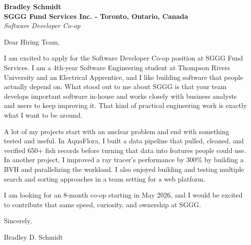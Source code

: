 \documentclass[11pt]{article}
\begin{document}
\textbf{Bradley Schmidt}\\
\vspace{0.5em}
\textbf{SGGG Fund Services Inc. - Toronto, Ontario, Canada}\\
\textit{Software Developer Co-op}

Dear Hiring Team,

\par

I am excited to apply for the Software Developer Co-op position at SGGG Fund Services. I am a 4th-year Software Engineering student at Thompson Rivers University and an Electrical Apprentice, and I like building software that people actually depend on. What stood out to me about SGGG is that your team develops important software in-house and works closely with business analysts and users to keep improving it. That kind of practical engineering work is exactly what I want to be around.

\par

A lot of my projects start with an unclear problem and end with something tested and useful. In AquaFlora, I built a data pipeline that pulled, cleaned, and verified 650+ fish records before turning that data into features people could use. In another project, I improved a ray tracer’s performance by 300\% by building a BVH and parallelizing the workload. I also enjoyed building and testing multiple search and sorting approaches in a team setting for a web platform.

\par

I am looking for an 8-month co-op starting in May 2026, and I would be excited to contribute that same speed, curiosity, and ownership at SGGG.

\par

Sincerely,

\par

Bradley D. Schmidt
\end{document}
